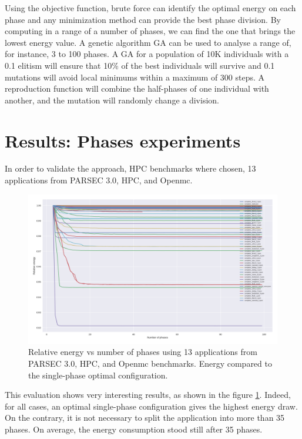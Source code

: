 Using the objective function, brute force can identify the optimal energy on each phase and any minimization method can provide the best phase division. By computing in a range of a number of phases, we can find the one that brings the lowest energy value. A genetic algorithm GA can be used to analyse a range of, for instance, 3 to 100 phases. A GA for a population of 10K individuals with a 0.1 elitism will ensure that 10\% of the best individuals will survive and 0.1 mutations will avoid local minimums within a maximum of 300 steps. A reproduction function will combine the half-phases of one individual with another, and the mutation will randomly change a division.

\section{Results: Phases experiments} \label{sec:results_phases_experiments}


In order to validate the approach, HPC benchmarks where chosen, 13 applications from PARSEC 3.0, HPC, and Openmc.

\begin{figure}[H]
\includegraphics[width=\columnwidth]{fingerprint/figures/energy_per_phase.png}
    \caption{Relative energy vs number of phases using 13 applications from PARSEC 3.0, HPC, and Openmc benchmarks. Energy compared to the single-phase optimal configuration.}
    \label{fig:relative_energy}
\end{figure}

This evaluation shows very interesting results, as shown in the figure \ref{fig:relative_energy}. Indeed, for all cases, an optimal single-phase configuration gives the highest energy draw. On the contrary, it is not necessary to split the application into more than 35 phases. On average, the energy consumption stood still after 35 phases. 

